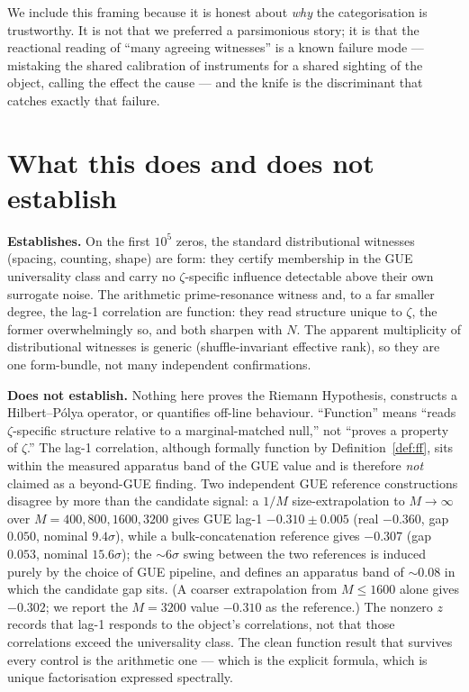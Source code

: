 \documentclass[11pt]{article}
\begin{document}
We include this framing because it is honest about \emph{why} the categorisation is trustworthy. It is not that we preferred a parsimonious story; it is that the reactional reading of ``many agreeing witnesses'' is a known failure mode --- mistaking the shared calibration of instruments for a shared sighting of the object, calling the effect the cause --- and the knife is the discriminant that catches exactly that failure.

\section{What this does and does not establish}

\textbf{Establishes.} On the first $10^5$ zeros, the standard distributional witnesses (spacing, counting, shape) are form: they certify membership in the GUE universality class and carry no $\zeta$-specific influence detectable above their own surrogate noise. The arithmetic prime-resonance witness and, to a far smaller degree, the lag-1 correlation are function: they read structure unique to $\zeta$, the former overwhelmingly so, and both sharpen with $N$. The apparent multiplicity of distributional witnesses is generic (shuffle-invariant effective rank), so they are one form-bundle, not many independent confirmations.

\textbf{Does not establish.} Nothing here proves the Riemann Hypothesis, constructs a Hilbert--P\'olya operator, or quantifies off-line behaviour. ``Function'' means ``reads $\zeta$-specific structure relative to a marginal-matched null,'' not ``proves a property of $\zeta$.'' The lag-1 correlation, although formally function by Definition~\ref{def:ff}, sits within the measured apparatus band of the GUE value and is therefore \emph{not} claimed as a beyond-GUE finding. Two independent GUE reference constructions disagree by more than the candidate signal: a $1/M$ size-extrapolation to $M\to\infty$ over $M=400,800,1600,3200$ gives GUE lag-1 $-0.310\pm0.005$ (real $-0.360$, gap $0.050$, nominal $9.4\sigma$), while a bulk-concatenation reference gives $-0.307$ (gap $0.053$, nominal $15.6\sigma$); the $\sim\!6\sigma$ swing between the two references is induced purely by the choice of GUE pipeline, and defines an apparatus band of $\sim\!0.08$ in which the candidate gap sits. (A coarser extrapolation from $M\le1600$ alone gives $-0.302$; we report the $M=3200$ value $-0.310$ as the reference.) The nonzero $z$ records that lag-1 responds to the object's correlations, not that those correlations exceed the universality class. The clean function result that survives every control is the arithmetic one --- which is the explicit formula, which is unique factorisation expressed spectrally.
\end{document}
